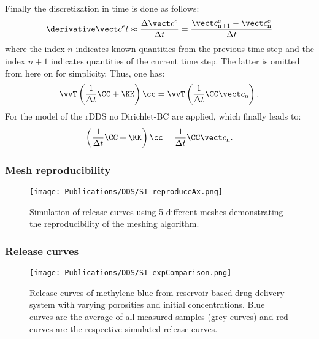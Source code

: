   Finally the discretization in time is done as follows:
  \begin{equation}
    \dcceDt \approx \frac{\Delta \cce}{\Dt}  = \frac{\ccenI-\ccen}{\Delta t}
  \end{equation}
  where the index $n$ indicates known quantities from the previous time step and the index $n+1$ indicates quantities of the current time step. The latter is omitted from here on for simplicity.
  Thus, one has: 
  \begin{equation}
    \vvT \left( \frac{1}{\Dt}\CC+ \KK \right) \cc = \vvT \left(\frac{1}{\Dt} \CC \ccn\right).
  \end{equation}
  For the model of the rDDS no Dirichlet-BC are applied, which finally leads to: 
  \begin{equation}
    \left( \frac{1}{\Dt}\CC+ \KK \right) \cc = \frac{1}{\Dt}\CC \ccn.
  \end{equation} 

  \newpage
  \subsubsection*{Mesh reproducibility}
  \begin{figure}[h!]
    \texttt{[image: Publications/DDS/SI-reproduceAx.png]}
    \caption{Simulation of release curves using 5 different meshes demonstrating the reproducibility of the meshing algorithm.}
    \label{fig:MeshReproducibility}
  \end{figure}

  \newpage
  \subsubsection*{Release curves}
  \begin{figure}[h!]
    \texttt{[image: Publications/DDS/SI-expComparison.png]}
    \caption{Release curves of methylene blue from reservoir-based drug delivery system with varying porosities and initial concentrations. Blue curves are the average of all measured samples (grey curves) and red curves are the respective simulated release curves. }
    \label{fig:expComparison}
  \end{figure}
